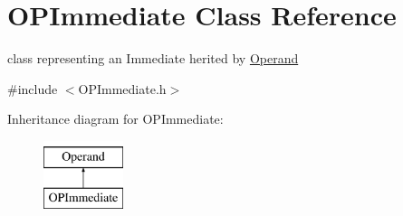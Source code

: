 \hypertarget{class_o_p_immediate}{}\section{O\+P\+Immediate Class Reference}
\label{class_o_p_immediate}


class representing an Immediate herited by \mbox{\hyperlink{class_operand}{Operand}}  




{\ttfamily \#include $<$O\+P\+Immediate.\+h$>$}

Inheritance diagram for O\+P\+Immediate\+:\begin{figure}[H]
\begin{center}
\leavevmode
\includegraphics[height=2.000000cm]{class_o_p_immediate}
\end{center}
\end{figure}

